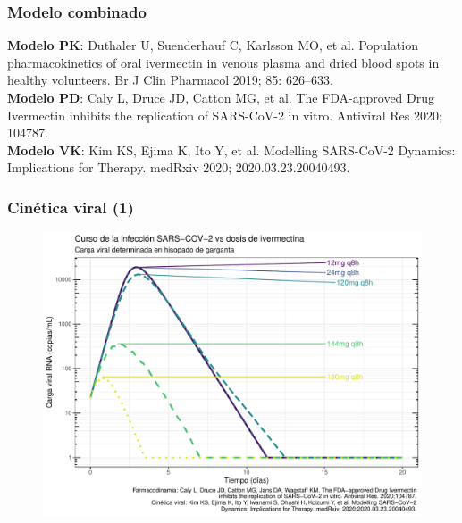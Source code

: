 \documentclass[12pt]{beamer}
\begin{document}
	\begin{frame}
		\frametitle{Modelo combinado}
		\centering
		
		
		\bigskip
		\parbox[b]{1.0\textwidth}{\tiny \textbf{Modelo PK}: Duthaler U, Suenderhauf C, Karlsson MO, et al. Population pharmacokinetics of oral ivermectin in venous plasma and dried blood spots in healthy volunteers. Br J Clin Pharmacol 2019; 85: 626–633. \\
			\textbf{Modelo PD}: Caly L, Druce JD, Catton MG, et al. The FDA-approved Drug Ivermectin inhibits the replication of SARS-CoV-2 in vitro. Antiviral Res 2020; 104787.\\
			\textbf{Modelo VK}: Kim KS, Ejima K, Ito Y, et al. Modelling SARS-CoV-2 Dynamics: Implications for Therapy. medRxiv 2020; 2020.03.23.20040493.}
	\end{frame}
	
	\begin{frame}	
		\frametitle{Cinética viral (1)}		
		\begin{figure}
			\centering
			\includegraphics[width=0.9\linewidth]{../modelo_PD_2/figuras/G3}
			\label{fig:g1}
		\end{figure}
	\end{frame}
\end{document}
